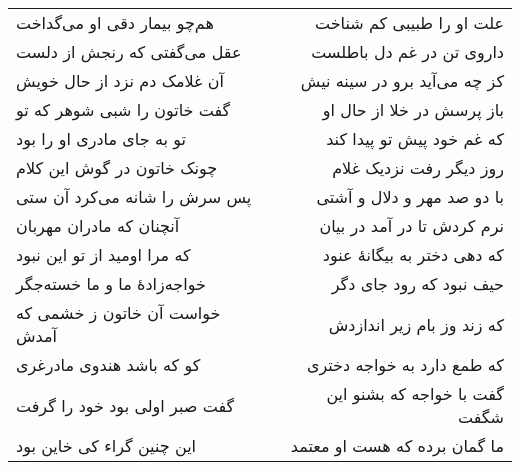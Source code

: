 \begin{center}
\begin{longtable}{l p{0.5cm} r}
هم‌چو بیمار دقی او می‌گداخت
&&
علت او را طبیبی کم شناخت
\\
عقل می‌گفتی که رنجش از دلست
&&
داروی تن در غم دل باطلست
\\
آن غلامک دم نزد از حال خویش
&&
کز چه می‌آید برو در سینه نیش
\\
گفت خاتون را شبی شوهر که تو
&&
باز پرسش در خلا از حال او
\\
تو به جای مادری او را بود
&&
که غم خود پیش تو پیدا کند
\\
چونک خاتون در گوش این کلام
&&
روز دیگر رفت نزدیک غلام
\\
پس سرش را شانه می‌کرد آن ستی
&&
با دو صد مهر و دلال و آشتی
\\
آنچنان که مادران مهربان
&&
نرم کردش تا در آمد در بیان
\\
که مرا اومید از تو این نبود
&&
که دهی دختر به بیگانهٔ عنود
\\
خواجه‌زادهٔ ما و ما خسته‌جگر
&&
حیف نبود که رود جای دگر
\\
خواست آن خاتون ز خشمی که آمدش
&&
که زند وز بام زیر اندازدش
\\
کو که باشد هندوی مادرغری
&&
که طمع دارد به خواجه دختری
\\
گفت صبر اولی بود خود را گرفت
&&
گفت با خواجه که بشنو این شگفت
\\
این چنین گراء کی خاین بود
&&
ما گمان برده که هست او معتمد
\\
\end{longtable}
\end{center}
